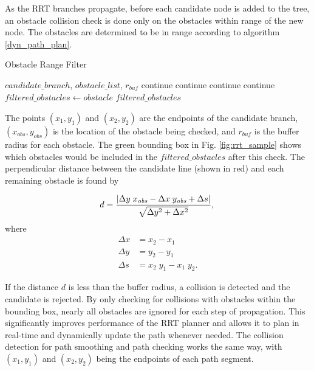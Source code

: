 \documentclass[letterpaper, 10 pt, conference]{ieeeconf}  %
\begin{document}
As the RRT branches propagate, before each candidate node is added to the tree, an obstacle collision check is done only on the obstacles within range of the new node. The obstacles are determined to be in range according to algorithm \ref{dyn_path_plan}.

\begin{algorithm}
  \caption{Obstacle Range Filter}
  \label{dyn_path_plan}
\begin{algorithmic}
  \REQUIRE $\mathit{candidate\_branch}$, $\mathit{obstacle\_list}$, $r_{\mathit{buf}}$
      \STATE continue
      \STATE continue
      \STATE continue
      \STATE continue
    \ELSE
      \STATE $\mathit{filtered\_obstacles} \gets \mathit{obstacle}$
    \ENDIF
  \ENDFOR
  \RETURN $\mathit{filtered\_obstacles}$
\end{algorithmic}
\end{algorithm}

 The points $(x_1,y_1)$ and $(x_2,y_2)$ are the endpoints of the candidate branch, $(x_{\mathit{obs}},y_{\mathit{obs}})$ is the location of the obstacle being checked, and $r_{\mathit{buf}}$ is the buffer radius for each obstacle. The green bounding box in Fig. \ref{fig:rrt_sample} shows which obstacles would be included in the $\mathit{filtered\_obstacles}$ after this check. The perpendicular distance between the candidate line (shown in red) and each remaining obstacle is found by

\begin{equation}
  d = \dfrac{|\Delta y \; x_{\mathit{obs}} -
      \Delta x \; y_{\mathit{obs}} + \Delta s|}
      {\sqrt{\Delta y^2 + \Delta x^2}},\\
\end{equation}
where
\begin{align}
  \Delta x &= x_2 - x_1\\
  \Delta y &= y_2 - y_1\\
  \Delta s &= x_2 \; y_1 -x_1 \; y_2.
\end{align}

 If the distance $d$ is less than the buffer radius, a collision is detected and the candidate is rejected. By only checking for collisions with obstacles within the bounding box, nearly all obstacles are ignored for each step of propagation. This significantly improves performance of the RRT planner and allows it to plan in real-time and dynamically update the path whenever needed. The collision detection for path smoothing and path checking works the same way, with $(x_1,y_1)$ and $(x_2,y_2)$ being the endpoints of each path segment.
\end{document}
